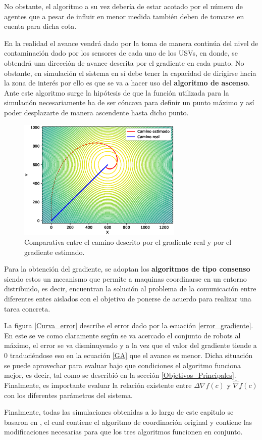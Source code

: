 No obstante, el algoritmo a su vez debería de estar acotado por el número de agentes que a pesar de influir en menor medida también deben de tomarse en cuenta para dicha cota.

En la realidad el avance vendrá dado por la toma de manera continúa del nivel de contaminación dado por los sensores de cada uno de los USVs, en donde, se obtendrá una dirección de avance descrita por el gradiente en cada punto. No obstante, en simulación el sistema en sí debe tener la capacidad de dirigirse hacia la zona de interés por ello es que se va a hacer uso del \textbf{algoritmo de ascenso}. Ante este algoritmo surge la hipótesis de que la función utilizada para la simulación necesariamente ha de ser cóncava para definir un punto máximo y así poder desplazarte de manera ascendente hasta dicho punto.\\

\begin{figure}[H]
\centering
\includegraphics[width=0.70\textwidth]{figures/Caso_Inicial/Caminos.eps}
\caption{Comparativa entre el camino descrito por el gradiente real y por el gradiente estimado.} \label{Dif_Caminos}
\end{figure}

Para la obtención del gradiente, se adoptan los \textbf{algoritmos de tipo consenso} siendo estos un mecanismo que permite a maquinas coordinarse en un entorno distribuido, es decir, encuentran la solución al problema de la comunicación entre diferentes entes aislados con el objetivo de ponerse de acuerdo para realizar una tarea concreta.










La figura \ref{Curva_error} describe el error dado por la ecuación \ref{error_gradiente}. En este se ve como claramente según se va acercado el conjunto de robots al máximo, el error se va disminuyendo y a la vez que el valor del gradiente tiende a 0 traduciéndose eso en la ecuación \ref{GA} que el avance es menor. Dicha situación se puede aprovechar para evaluar bajo que condiciones el algoritmo funciona mejor, es decir, tal como se describió en la sección \ref{Objetivos_Principales}. Finalmente, es importante evaluar la relación existente entre $\Delta{\nabla{f\left(c\right)}}$ y $\hat{\nabla}{f\left(c\right)}$ con los diferentes parámetros del sistema.


Finalmente, todas las simulaciones obtenidas a lo largo de este capitulo se basaron en \cite{Git_Hector}, el cual contiene el algoritmo de coordinación original y \cite{Git_todos} contiene las modificaciones necesarias para que los tres algoritmos funcionen en conjunto.
